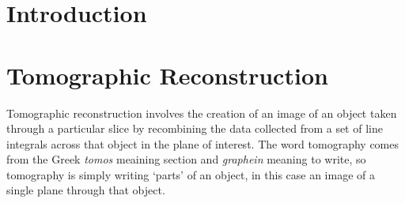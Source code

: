 
\section{Introduction} %
	\label{sec:introduction}


\section{Tomographic Reconstruction} %
	\label{sec:tomographic_reconstruction}
	Tomographic reconstruction involves the creation of an image of an object taken through a particular slice by recombining the data collected from a set of line integrals across that object in the plane of interest. The word tomography comes from the Greek \textit{tomos} meaining section and \textit{graphein} meaning to write, so tomography is simply writing `parts' of an object, in this case an image of a single plane through that object.

